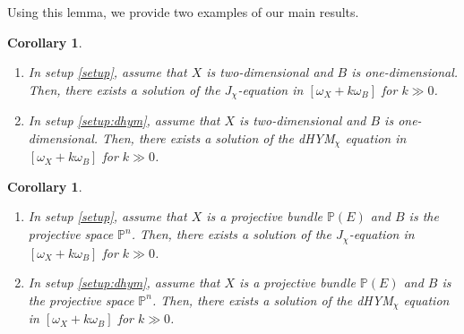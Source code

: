 \documentclass{amsart}
\numberwithin{equation}{section}
\theoremstyle{plain}
\newtheorem{corollary}[equation]{Corollary}
\theoremstyle{definition}
\theoremstyle{remark}
\begin{document}
Using this lemma, we provide two examples of our main results. 

\begin{corollary}\label{cor:surf}
    \begin{enumerate}
        \item In setup \ref{setup}, assume that $X$ is two-dimensional and $B$ is one-dimensional.
        Then, there exists a solution of the $J_\chi$-equation in $[\omega_X+k\omega_B]$ for $k\gg0$. 
        \item In setup \ref{setup:dhym}, assume that $X$ is two-dimensional and $B$ is one-dimensional. Then, there exists a solution of the dHYM$_\chi$ equation in $[\omega_X+k\omega_B]$ for $k\gg0$.
    \end{enumerate}
\end{corollary}


\begin{corollary}\label{cor:proj}
    \begin{enumerate}
        \item In setup \ref{setup}, assume that $X$ is a projective bundle $\mathbb{P}(E)$ and $B$ is the projective space $\mathbb{P}^{n}$.
        Then, there exists a solution of the $J_\chi$-equation in $[\omega_X+k\omega_B]$ for $k\gg0$. 
        \item In setup \ref{setup:dhym}, assume that $X$ is a projective bundle $\mathbb{P}(E)$ and $B$ is the projective space $\mathbb{P}^{n}$. Then, there exists a solution of the dHYM$_\chi$ equation in $[\omega_X+k\omega_B]$ for $k\gg0$.
    \end{enumerate}
\end{corollary}
\end{document}
